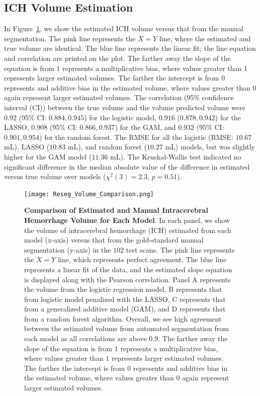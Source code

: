 \subsection{ICH Volume Estimation}
In Figure~\ref{fig:vol}, we show the estimated ICH volume versus that from the manual segmentation.  The pink line represents the $X = Y$ line, where the estimated and true volume are identical.  The blue line represents the linear fit; the line equation and correlation are printed on the plot.  The farther away the slope of the equation is from $1$ represents a multiplicative bias, where values greater than $1$ represents larger estimated volumes.  The farther the intercept is from $0$ represents and additive bias in the estimated volume, where values greater than $0$ again represent larger estimated volumes.  The correlation (95\% confidence interval (CI)) between the true volume and the volume predicted volume were $0.92$ (95\% CI: $0.884, 0.945$) for the logistic model, 
$0.916$ ($0.878, 0.942$) for the LASSO, 
$0.908$ (95\% CI: $0.866, 0.937$) for the GAM, and  
$0.932$ (95\% CI: $0.901, 0.954$) for the random forest.  The RMSE for all the logistic (RMSE: $10.67$ mL), LASSO ($10.83$ mL), and random forest ($10.27$ mL) models, but was slightly higher for the GAM model ($11.36$ mL).  The  Kruskal-Wallis test indicated no significant difference in the median absolute value of the difference in estimated versus true volume over models ($\chi^{2}(3)=2.3$, $p = 0.51$).  



\begin{figure}
\centering

\texttt{[image: Reseg\_Volume\_Comparison.png]}
\caption{{\bf Comparison of Estimated and Manual Intracerebral Hemorrhage Volume for Each Model}.  In each panel, we show the volume of intracerebral hemorrhage (ICH) estimated from each model (x-axis) versus that from the gold-standard manual segmentation (y-axis) in the $102$ test scans.  The pink line represents the $X=Y$ line, which represents perfect agreement.  The blue line represents a linear fit of the data, and the estimated slope equation is displayed along with the Pearson correlation.  Panel A represents the volume from the logistic regression model, B represents that from logistic model penalized with the LASSO, C represents that from a generalized additive model (GAM), and D represents that from a random forest algorithm.  Overall, we see high agreement between the estimated volume from automated segmentation from each model as all correlations are above $0.9$.  The farther away the slope of the equation is from $1$ represents a multiplicative bias, where values greater than $1$ represents larger estimated volumes.  The farther the intercept is from $0$ represents and additive bias in the estimated volume, where values greater than $0$ again represent larger estimated volumes.  }
\label{fig:vol}
\end{figure}

